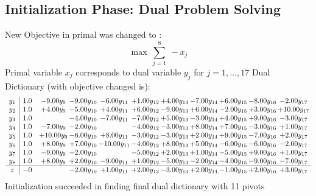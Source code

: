 \documentclass[9pt]{article}
\begin{document}
\subsection{Initialization Phase: Dual Problem Solving}
New Objective in primal was changed to : \[ \max\ \sum_{j=1}^{8}\ - x_j \] 
Primal variable $x_j$ corresponds to dual variable $y_j$ for $j = 1,\ldots,17$
Dual Dictionary (with objective changed is): 
\[\begin{array}{c| c c@{\hskip 2pt} c@{\hskip 2pt} c@{\hskip 2pt} c@{\hskip 2pt} c@{\hskip 2pt} c@{\hskip 2pt} c@{\hskip 2pt} c@{\hskip 2pt} c@{\hskip 2pt} }
 y_{1}   &  1.0 & -9.00 y_{9} & -9.00 y_{10} & -6.00 y_{11} & +  1.00 y_{12} & +  4.00 y_{13} & -7.00 y_{14} & +  6.00 y_{15} & -8.00 y_{16} & -2.00 y_{17}\\
 y_{2}   &  1.0 & +  4.00 y_{9} & -5.00 y_{10} & +  4.00 y_{11} & +  6.00 y_{12} & -9.00 y_{13} & +  6.00 y_{14} & -2.00 y_{15} & +  3.00 y_{16} & + 10.00 y_{17}\\
 y_{3}   &  1.0  &   & -4.00 y_{10} & -7.00 y_{11} & -7.00 y_{12} & +  5.00 y_{13} & -3.00 y_{14} & +  4.00 y_{15} & +  9.00 y_{16} & -3.00 y_{17}\\
 y_{4}   &  1.0 & -7.00 y_{9} & -2.00 y_{10} &   & -4.00 y_{12} & -3.00 y_{13} & +  8.00 y_{14} & +  7.00 y_{15} & -3.00 y_{16} & +  1.00 y_{17}\\
 y_{5}   &  1.0 & + 10.00 y_{9} & -6.00 y_{10} & +  8.00 y_{11} & -3.00 y_{12} & -3.00 y_{13} & +  2.00 y_{14} & +  9.00 y_{15} & -7.00 y_{16} & +  2.00 y_{17}\\
 y_{6}   &  1.0 & +  8.00 y_{9} & +  7.00 y_{10} & -10.00 y_{11} & -4.00 y_{12} & +  8.00 y_{13} & +  5.00 y_{14} & -6.00 y_{15} & -6.00 y_{16} & -2.00 y_{17}\\
 y_{7}   &  1.0 & -9.00 y_{9} & -2.00 y_{10} &   & -5.00 y_{12} & +  2.00 y_{13} & +  1.00 y_{14} & -5.00 y_{15} & +  9.00 y_{16} & +  1.00 y_{17}\\
 y_{8}   &  1.0 & +  8.00 y_{9} & +  2.00 y_{10} & -9.00 y_{11} & +  1.00 y_{12} & -5.00 y_{13} & -2.00 y_{14} & -4.00 y_{15} & -9.00 y_{16} & -7.00 y_{17}\\
\hline
z    &  -0  &   & -2.00 y_{10} & +  1.00 y_{11} & +  2.00 y_{12} & -3.00 y_{13} & +  2.00 y_{14} & -1.00 y_{15} & +  2.00 y_{16} & +  3.00 y_{17}\\
\end{array}\]
Initialization succeeded in finding final dual dictionary with 11 pivots
\end{document}
